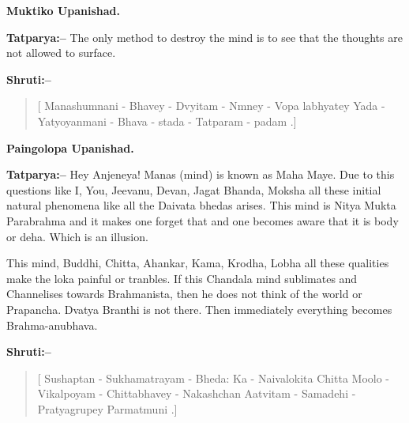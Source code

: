 \begin{flushright}
\textbf{Muktiko Upanishad.}
\end{flushright}

\textbf{Tatparya:–} The only method to destroy the mind is to see that the thoughts are not allowed to surface.

\newpage

\textbf{Shruti:–}

\begin{verse}
[ Manashumnani - Bhavey - Dvyitam - Nmney - Vopa labhyatey  Yada - Yatyoyanmani - Bhava - stada - Tatparam - padam .]
\end{verse}

\begin{flushright}
\textbf{Paingolopa Upanishad.}
\end{flushright}

\textbf{Tatparya:–} Hey Anjeneya! Manas (mind) is known as Maha Maye. Due to this questions like I, You, Jeevanu, Devan, Jagat Bhanda, Moksha all these initial natural phenomena like all the Daivata bhedas arises. This mind is Nitya Mukta Parabrahma and it makes one forget that and one becomes aware that it is body or deha. Which is an illusion.

This mind, Buddhi, Chitta, Ahankar, Kama, Krodha, Lobha all these qualities make the loka painful or tranbles. If this Chandala mind sublimates and Channelises towards Brahmanista, then he does not think of the world or Prapancha. Dvatya Branthi is not there. Then immediately everything becomes Brahma-anubhava.

\textbf{Shruti:–}

\begin{verse}
[ Sushaptan - Sukhamatrayam - Bheda: Ka - Naivalokita  Chitta Moolo - Vikalpoyam - Chittabhavey - Naka\break shchan Aatvitam - Samadehi - Pratyagrupey Parmatmuni .]
\end{verse}

